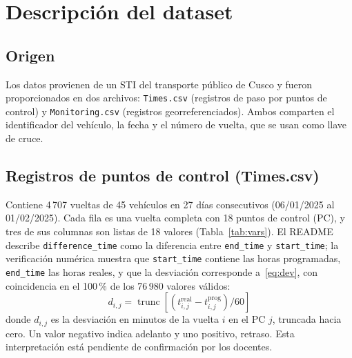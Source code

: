 \documentclass[conference]{IEEEtran}
\begin{document}
\section{Descripción del dataset}\label{sec:datos}

\subsection{Origen}
Los datos provienen de un STI del transporte público de Cusco y fueron proporcionados en dos archivos: \texttt{Times.csv} (registros de paso por puntos de control) y \texttt{Monitoring.csv} (registros georreferenciados). Ambos comparten el identificador del vehículo, la fecha y el número de vuelta, que se usan como llave de cruce.

\subsection{Registros de puntos de control (Times.csv)}
Contiene 4\,707 vueltas de 45 vehículos en 27 días consecutivos (06/01/2025 al 01/02/2025). Cada fila es una vuelta completa con 18 puntos de control (PC), y tres de sus columnas son listas de 18 valores (Tabla~\ref{tab:vars}). El README describe \texttt{difference\_time} como la diferencia entre \texttt{end\_time} y \texttt{start\_time}; la verificación numérica muestra que \texttt{start\_time} contiene las horas programadas, \texttt{end\_time} las horas reales, y que la desviación corresponde a~\eqref{eq:dev}, con coincidencia en el 100\,\% de los 76\,980 valores válidos:
\begin{equation}\label{eq:dev}
d_{i,j} = \operatorname{trunc}\left[\left(t^{\text{real}}_{i,j} - t^{\text{prog}}_{i,j}\right)/60\right]
\end{equation}
donde $d_{i,j}$ es la desviación en minutos de la vuelta $i$ en el PC $j$, truncada hacia cero. Un valor negativo indica adelanto y uno positivo, retraso. %
Esta interpretación está pendiente de confirmación por los docentes.
\end{document}
